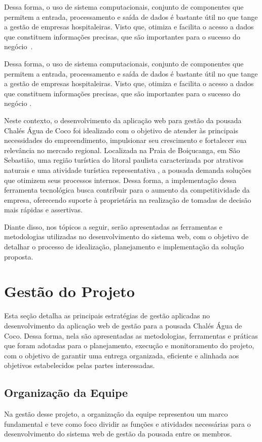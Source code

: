 \documentclass[
	12pt,				%
	openany,			%
	oneside,			%
	a4paper,			%
	english,			%
	french,				%
	spanish,			%
	brazil				%
	]{abntex2}
\begin{document}
Dessa forma, o uso de sistema computacionais, conjunto de componentes que permitem a entrada, processamento e saída de dados é bastante útil no que tange a gestão de empresas hospitaleiras. Visto que, otimiza e facilita o acesso a dados que constituem informações precisas,  que são importantes para o sucesso do negócio~\cite{zeferino2012}.

Dessa forma, o uso de sistema computacionais, conjunto de componentes que permitem a entrada, processamento e saída de dados é bastante útil no que tange a gestão de empresas hospitaleiras. Visto que, otimiza e facilita o acesso a dados que constituem informações precisas,  que são importantes para o sucesso do negócio \cite{zeferino2012}.

Neste contexto, o desenvolvimento da aplicação web para gestão da pousada Chalés Água de Coco foi idealizado com o objetivo de atender às principais necessidades do empreendimento, impulsionar seu crescimento e fortalecer sua relevância no mercado regional. Localizada na Praia de Boiçucanga, em São Sebastião, uma região turística do litoral paulista caracterizada por atrativos naturais e uma atividade turística representativa \cite{franchi2012}, a pousada demanda soluções que otimizem seus processos internos. Dessa forma, a implementação dessa ferramenta tecnológica busca contribuir para o aumento da competitividade da empresa, oferecendo suporte à proprietária na realização de tomadas de decisão mais rápidas e assertivas.

Diante disso, nos tópicos a seguir, serão apresentadas as ferramentas e metodologias utilizadas no desenvolvimento do sistema web, com o objetivo de detalhar o processo de idealização, planejamento e implementação da solução proposta.
\chapter{Gestão do Projeto}
Esta seção detalha as principais estratégias de gestão aplicadas no desenvolvimento da aplicação web de gestão para a pousada Chalés Água de Coco. Dessa forma, nela são apresentadas as metodologias, ferramentas e práticas que foram adotadas para o planejamento, execução e monitoramento do projeto, com o objetivo de garantir uma entrega organizada, eficiente e alinhada aos objetivos estabelecidos pelas partes interessadas.
% 
\section{Organização da Equipe}
Na gestão desse projeto, a organização da equipe representou um marco fundamental e teve como foco dividir as funções e atividades necessárias para o desenvolvimento do sistema web de gestão da pousada entre os membros.%
\end{document}
